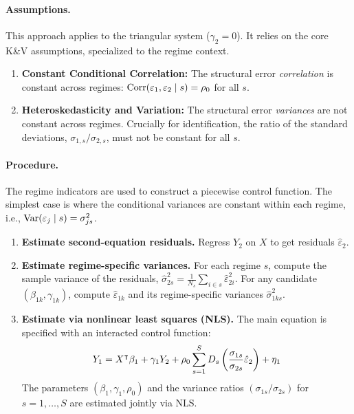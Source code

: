 \paragraph{Assumptions.}
This approach applies to the triangular system ($\gamma_2=0$). It relies on the core K\&V assumptions, specialized to the regime context.
\begin{enumerate}
    \itemsep1pt
    \item \textbf{Constant Conditional Correlation:} The structural error \emph{correlation} is constant across regimes: $\operatorname{Corr}(\varepsilon_1, \varepsilon_2 \mid s) = \rho_0$ for all $s$.
    \item \textbf{Heteroskedasticity and Variation:} The structural error \emph{variances} are not constant across regimes. Crucially for identification, the ratio of the standard deviations, $\sigma_{1,s}/\sigma_{2,s}$, must not be constant for all $s$.
\end{enumerate}

\paragraph{Procedure.}
The regime indicators are used to construct a piecewise control function. The simplest case is where the conditional variances are constant within each regime, i.e., $\operatorname{Var}(\varepsilon_j \mid s) = \sigma_{js}^2$.
\begin{enumerate}
    \itemsep2pt
    \item \textbf{Estimate second-equation residuals.} Regress $Y_2$ on $X$ to get residuals $\hat{\varepsilon}_2$.
    \item \textbf{Estimate regime-specific variances.} For each regime $s$, compute the sample variance of the residuals, $\hat{\sigma}_{2s}^2 = \frac{1}{N_s}\sum_{i \in s} \hat{\varepsilon}_{2i}^2$. For any candidate $(\beta_{1k}, \gamma_{1k})$, compute $\hat{\varepsilon}_{1k}$ and its regime-specific variances $\hat{\sigma}_{1ks}^2$.
    \item \textbf{Estimate via nonlinear least squares (NLS).} The main equation is specified with an interacted control function:
    \[
    Y_1 = X^{\intercal}\beta_1 + \gamma_1 Y_2 + \rho_0 \sum_{s=1}^S D_s \left( \frac{\sigma_{1s}}{\sigma_{2s}} \hat{\varepsilon}_2 \right) + \eta_1
    \]
    The parameters $(\beta_1, \gamma_1, \rho_0)$ and the variance ratios $(\sigma_{1s}/\sigma_{2s})$ for $s=1,\dots,S$ are estimated jointly via NLS.
\end{enumerate}

